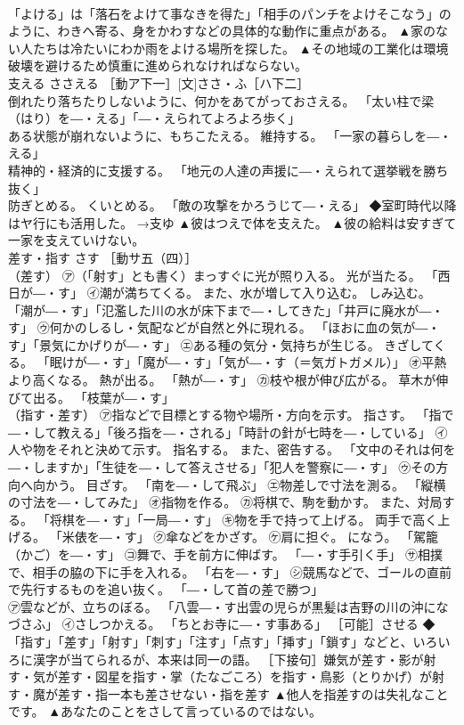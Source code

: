 \documentclass[8pt]{extreport}
\begin{document}
\begin{CJK}{UTF8}{min}
\\	「よける」は「落石をよけて事なきを得た」「相手のパンチをよけそこなう」のように、わきへ寄る、身をかわすなどの具体的な動作に重点がある。	▲家のない人たちは冷たいにわか雨をよける場所を探した。 ▲その地域の工業化は環境破壊を避けるため慎重に進められなければならない。
\\	支える	ささえる	［動ア下一］[文]ささ・ふ［ハ下二］ 
\\	倒れたり落ちたりしないように、何かをあてがっておさえる。 「太い柱で梁（はり）を―・える」「―・えられてよろよろ歩く」 
\\	ある状態が崩れないように、もちこたえる。 維持する。 「一家の暮らしを―・える」 
\\	精神的・経済的に支援する。 「地元の人達の声援に―・えられて選挙戦を勝ち抜く」 
\\	防ぎとめる。 くいとめる。 「敵の攻撃をかろうじて―・える」 ◆室町時代以降はヤ行にも活用した。 →支ゆ	▲彼はつえで体を支えた。 ▲彼の給料は安すぎて一家を支えていけない。
\\	差す・指す	さす	［動サ五（四）］ 
\\	（差す） ㋐（「射す」とも書く）まっすぐに光が照り入る。 光が当たる。 「西日が―・す」 ㋑潮が満ちてくる。 また、水が増して入り込む。 しみ込む。 「潮が―・す」「氾濫した川の水が床下まで―・してきた」「井戸に廃水が―・す」 ㋒何かのしるし・気配などが自然と外に現れる。 「ほおに血の気が―・す」「景気にかげりが―・す」 ㋓ある種の気分・気持ちが生じる。 きざしてくる。 「眠けが―・す」「魔が―・す」「気が―・す（＝気ガトガメル）」 ㋔平熱より高くなる。 熱が出る。 「熱が―・す」 ㋕枝や根が伸び広がる。 草木が伸びて出る。 「枝葉が―・す」 
\\	（指す・差す） ㋐指などで目標とする物や場所・方向を示す。 指さす。 「指で―・して教える」「後ろ指を―・される」「時計の針が七時を―・している」 ㋑人や物をそれと決めて示す。 指名する。 また、密告する。 「文中のそれは何を―・しますか」「生徒を―・して答えさせる」「犯人を警察に―・す」 ㋒その方向へ向かう。 目ざす。 「南を―・して飛ぶ」 ㋓物差しで寸法を測る。 「縦横の寸法を―・してみた」 ㋔指物を作る。 ㋕将棋で、駒を動かす。 また、対局する。 「将棋を―・す」「一局―・す」 ㋖物を手で持って上げる。 両手で高く上げる。 「米俵を―・す」 ㋗傘などをかざす。 ㋘肩に担ぐ。 になう。 「駕籠（かご）を―・す」 ㋙舞で、手を前方に伸ばす。 「―・す手引く手」 ㋚相撲で、相手の脇の下に手を入れる。 「右を―・す」 ㋛競馬などで、ゴールの直前で先行するものを追い抜く。 「―・して首の差で勝つ」 
\\	㋐雲などが、立ちのぼる。 「八雲―・す出雲の児らが黒髪は吉野の川の沖になづさふ」 ㋑さしつかえる。 「ちとお寺に―・す事ある」 ［可能］させる ◆「指す」「差す」「射す」「刺す」「注す」「点す」「挿す」「鎖す」などと、いろいろに漢字が当てられるが、本来は同一の語。 ［下接句］嫌気が差す・影が射す・気が差す・図星を指す・掌（たなごころ）を指す・鳥影（とりかげ）が射す・魔が差す・指一本も差させない・指を差す	▲他人を指差すのは失礼なことです。 ▲あなたのことをさして言っているのではない。

\end{CJK}
\end{document}
